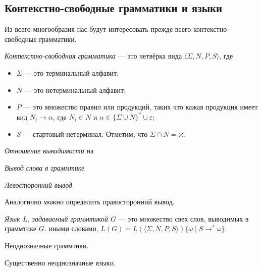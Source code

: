 \subsection{Контекстно-свободные грамматики и языки}

Из всего многообразия нас будут интересовать прежде всего контекстно-свободные грамматики.

\begin{definition}
\textit{Контекстно-свободная грамматика} --- это четвёрка вида $\langle \Sigma, N, P, S \rangle$, где
\begin{itemize}
  \item $\Sigma$ --- это терминальный алфавит;
  \item $N$ --- это нетерминальный алфавит;
  \item $P$ --- это множество правил или продукций, таких что кажая продукция имеет вид $N_i \to \alpha$, где $N_i \in N$ и $\alpha \in \{\Sigma \cup N\}^* \cup {\varepsilon}$;
  \item $S$ --- стартовый нетерминал.
  Отметим, что $\Sigma \cap N = \varnothing$.
\end{itemize}
\end{definition}

\begin{definition}
\textit{Отношение выводимости} на $ $
\end{definition}

\begin{definition}
\textit{Вывод слова в граммтике}
\end{definition}

\begin{definition}
\textit{Левосторонний вывод}
\end{definition}

Аналогично можно определить правосторонний вывод.

\begin{definition}
\textit{Язык $L$, задаваемый граммтикой $G$} ---  это множество свех слов, выводимых в граммтике $G$. иными словами, $L(G) = L(\langle \Sigma, N, P, S \rangle)\{ \omega \mid S \to ^* \omega\}$.
\end{definition}

Неоднозначные граммтики.

Существенно неоднозначные языки.


